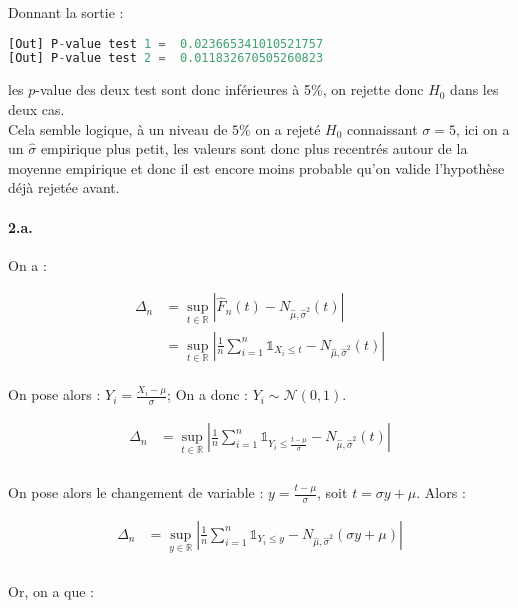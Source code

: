 \documentclass[a4paper,10pt]{report}
\begin{document}
Donnant la sortie :

\begin{lstlisting}[language=Python]
[Out] P-value test 1 =  0.023665341010521757
[Out] P-value test 2 =  0.011832670505260823

\end{lstlisting}

les $p$-value des deux test sont donc inférieures à 5\%, on rejette donc $H_0$ dans les deux cas.\\

Cela semble logique, à un niveau de $5 \%$ on a rejeté $H_0$ connaissant $\sigma = 5$, ici on a un $\hat{\sigma}$ empirique plus petit, les valeurs sont donc plus recentrés autour de la moyenne empirique et donc il est encore moins probable qu'on valide l'hypothèse déjà rejetée avant.

\paragraph{2.a.} On a :

$$
\begin{aligned}
\Delta_n & = \sup_{t \in \mathbb{R}} \left|\hat{F}_n(t) - N_{\hat{\mu}, \hat{\sigma}^2}(t)\right| \\
&= \sup_{t \in \mathbb{R}} \left|  \frac{1}{n} \sum_{i=1}^n \mathds{1}_{X_i \leq t}   - N_{\hat{\mu}, \hat{\sigma}^2}(t)\right|
\end{aligned}
$$\\
\newline
On pose alors : $Y_i = \frac{X_i - \mu}{\sigma}$; On a donc : $Y_i \sim \mathcal{N}(0,1)$.

$$
\begin{aligned}
\Delta_n &= \sup_{t \in \mathbb{R}} \left|  \frac{1}{n} \sum_{i=1}^n \mathds{1}_{Y_i \leq \frac{t - \mu}{\sigma}}   - N_{\hat{\mu}, \hat{\sigma}^2}(t)\right| \\
\end{aligned}
$$\\
\newline
On pose alors le changement de variable : $y = \frac{t - \mu}{\sigma}$, soit $t = \sigma y + \mu$. Alors :

$$
\begin{aligned}
\Delta_n &= \sup_{y \in \mathbb{R}} \left|  \frac{1}{n} \sum_{i=1}^n \mathds{1}_{Y_i \leq y}   - N_{\hat{\mu}, \hat{\sigma}^2}(\sigma y + \mu)\right| \\
\end{aligned}
$$\\
\newline
Or, on a que :
\end{document}
